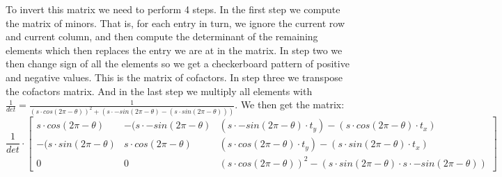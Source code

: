 To invert this matrix we need to perform 4 steps. In the first step we compute the matrix of minors. That is, for each entry in turn, we ignore the current row and current column, and then compute the determinant of the remaining elements which then replaces the entry we are at in the matrix. In step two we then change sign of all the elements so we get a checkerboard pattern of positive and negative values. This is the matrix of cofactors. In step three we transpose the cofactors matrix. And in the last step we multiply all elements with $\frac{1}{det} = \frac{1}{(s\cdot cos(2\pi-\theta))^2+(s\cdot -sin(2\pi-\theta)-(s\cdot sin(2\pi-\theta)))}$. We then get the matrix:
\begin{equation*}
	\frac{1}{det} \cdot 
	\begin{bmatrix}
		s\cdot cos(2\pi-\theta)&-(s\cdot -sin(2\pi-\theta)&(s\cdot -sin(2\pi-\theta)\cdot t_y)-(s\cdot cos(2\pi-\theta)\cdot t_x)\\
		-(s\cdot sin(2\pi-\theta)&s\cdot cos(2\pi-\theta)&(s\cdot cos(2\pi-\theta)\cdot t_y)-(s\cdot sin(2\pi-\theta)\cdot t_x)\\
		0&0&(s\cdot cos(2\pi-\theta))^2-(s\cdot sin(2\pi-\theta)\cdot s\cdot -sin(2\pi-\theta))
	\end{bmatrix}
\end{equation*}

